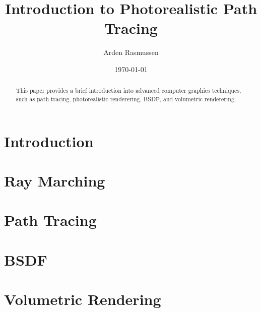 \documentclass[10pt]{amsart}
\title{Introduction to Photorealistic Path Tracing}
\author{Arden Rasmussen}
\date{\today}
\begin{document}
\begin{abstract}
    This paper provides a brief introduction into advanced computer graphics
    techniques, such as path tracing, photorealistic renderering, BSDF, and
    volumetric renderering.
\end{abstract}

\maketitle

\section{Introduction}\label{sec:introduction}

\section{Ray Marching}\label{sec:ray_marching}
\section{Path Tracing}\label{sec:path_tracing}
\section{BSDF}\label{sec:bsdf}
\section{Volumetric Rendering}\label{sec:volumetric_rendering}
\end{document}
